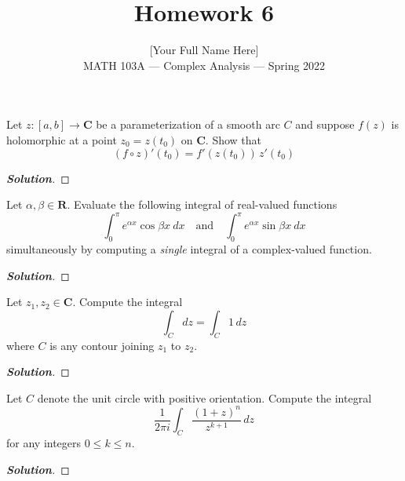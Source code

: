 \documentclass[11pt]{article}
\newenvironment{problem}[2][Problem\!]{\begin{trivlist}
\item[\hskip \labelsep {\bfseries #1}\hskip \labelsep {\bfseries #2.}]}{\end{trivlist}}
\newenvironment{solution}{\begin{proof}[\textbf{\textit{Solution}}]}{\end{proof}}
\newcommand{\rr}{\mathbf R}   %
\newcommand{\cc}{\mathbf C}   %
\renewcommand{\leq}{\leqslant}
\begin{document}
 
\title{Homework 6}
\author{[Your Full Name Here]\\[0.5em]
MATH 103A --- Complex Analysis --- Spring 2022}
\date{} 
\maketitle


\begin{problem}{6.1}
Let $z : [a, b] \to \cc$ be a parameterization of a smooth arc $C$ and suppose $f(z)$ is holomorphic at a point $z_0 = z(t_0)$ on $\cc$. Show that
\[(f \circ z)'(t_0) = f'(z(t_0))\,z'(t_0)\]
\end{problem}
\begin{solution}
\end{solution}

\newpage  %

\begin{problem}{6.2}
Let $\alpha, \beta \in \rr$. Evaluate the following integral of real-valued functions
\[\int_0^\pi e^{\alpha x}\cos\beta x\ dx \quad \text{and} \quad \int_0^\pi  e^{\alpha x}\sin\beta x\ dx\]
simultaneously by computing a \emph{single} integral of a complex-valued function.
\end{problem}
\begin{solution}
\end{solution}

\newpage  %

\begin{problem}{6.3}
Let $z_1, z_2 \in \cc$. Compute the integral
\[\int_C dz = \int_C 1\,dz\]
where $C$ is any contour joining $z_1$ to $z_2$.
\end{problem}
\begin{solution}
\end{solution}

\newpage  %

\begin{problem}{6.4}
Let $C$ denote the unit circle with positive orientation. Compute the integral
\[\frac{1}{2\pi i}\int_C \frac{(1 + z)^n}{z^{k+1}}\,dz\]
for any integers $0 \leq k \leq n$.
\end{problem}
\begin{solution}
\end{solution}
\end{document}
